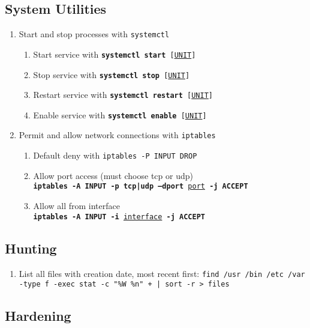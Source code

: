 \documentclass[12pt,letterpaper]{article}
\def\code#1{\textcolor{c2}{\texttt{#1}}}
\def\bf#1{\textbf{#1}}
\def\ul#1{\underline{#1}}
\begin{document}
\subsection{System Utilities}

\begin{enumerate}
	\item Start and stop processes with \code{systemctl}
	\begin{enumerate}
		\item Start service with \code{\bf{systemctl start} [\ul{UNIT}]}
		\item Stop service with \code{\bf{systemctl stop} [\ul{UNIT}]}
		\item Restart service with \code{\bf{systemctl restart} [\ul{UNIT}]}
		\item Enable service with \code{\bf{systemctl enable} [\ul{UNIT}]}
	\end{enumerate}
	\item Permit and allow network connections with \code{iptables}
	\begin{enumerate}
		\item Default deny with \code{iptables -P INPUT DROP}
		\item Allow port access (must choose tcp or udp) \\
			\code{\bf{iptables -A INPUT -p tcp|udp --dport} \ul{port} \bf{-j ACCEPT}}
		\item Allow all from interface \\
			\code{\bf{iptables -A INPUT -i} \ul{interface} \bf{-j ACCEPT}}
	\end{enumerate}
\end{enumerate}

\subsection{Hunting}

\begin{enumerate}
	\item List all files with creation date, most recent first: \code{find /usr /bin /etc /var -type f -exec stat -c "\%W \%n" {} + | sort -r > files}
\end{enumerate}

\subsection{Hardening}
\end{document}
